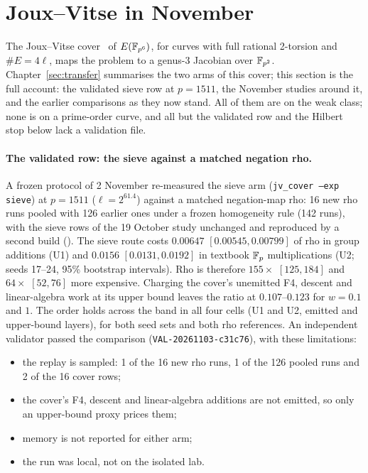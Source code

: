 \section{Joux--Vitse in November}\label{sec:jac-jv}

The Joux--Vitse cover~\cite{jouxvitse2012} of $E(\mathbb{F}_{p^6})$, for curves with
full rational 2-torsion and $\#E=4\ell$, maps the problem to a genus-3
Jacobian over $\mathbb{F}_{p^2}$. Chapter~\ref{sec:transfer} summarises the two arms
of this cover; this section is the full account: the validated sieve row at
$p=1511$, the November studies around it, and the earlier comparisons as
they now stand. All of them are on the weak class; none is on a prime-order
curve, and all but the validated row and the Hilbert stop below lack a
validation file.

\paragraph{The validated row: the sieve against a matched negation rho.} A
frozen protocol of 2 November re-measured the sieve arm
(\texttt{jv\_cover --exp sieve}) at $p=1511$ ($\ell=2^{61.4}$) against a
matched negation-map rho: 16 new rho runs pooled with 126 earlier ones under
a frozen homogeneity rule (142 runs), with the sieve rows of the 19 October
study unchanged and reproduced by a second build
(). The sieve route costs $0.00647$
$[0.00545,0.00799]$ of rho in group additions (U1) and $0.0156$
$[0.0131,0.0192]$ in textbook $\mathbb{F}_p$ multiplications (U2; seeds 17--24,
95\% bootstrap intervals). Rho is therefore $155\times$ $[125,184]$ and
$64\times$ $[52,76]$ more expensive. Charging the cover's unemitted F4,
descent and linear-algebra work at its upper bound leaves the ratio at
$0.107$--$0.123$ for $w=0.1$ and $1$. The order holds across the band in
all four cells (U1 and U2, emitted and upper-bound layers), for both seed
sets and both rho references. An independent validator passed the
comparison (\texttt{VAL-20261103-c31c76}), with these limitations:
\begin{itemize}
\item the replay is sampled: 1 of the 16 new rho runs, 1 of the 126 pooled
  runs and 2 of the 16 cover rows;
\item the cover's F4, descent and linear-algebra additions are not emitted,
  so only an upper-bound proxy prices them;
\item memory is not reported for either arm;
\item the run was local, not on the isolated lab.
\end{itemize}
